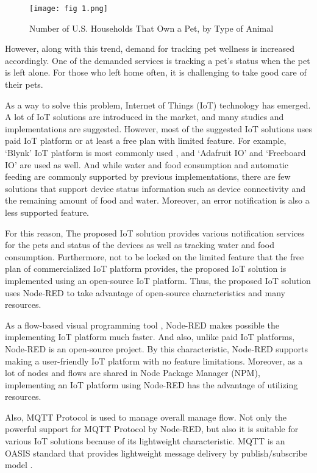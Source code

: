 \documentclass[conference]{IEEEtran}
\begin{document}
\begin{figure}[htbp]
\centerline{\texttt{[image: fig 1.png]}}
\caption{Number of U.S. Households That Own a Pet, by Type of Animal
}
\label{fig}
\end{figure}

However, along with this trend, demand for tracking pet wellness is increased accordingly. One of the demanded services is tracking a pet’s status when the pet is left alone. For those who left home often, it is challenging to take good care of their pets.

\indent As a way to solve this problem, Internet of Things (IoT) technology has emerged. A lot of IoT solutions are introduced in the market, and many studies and implementations are suggested. However, most of the suggested IoT solutions uses paid IoT platform or at least a free plan with limited feature. For example, ‘Blynk’ IoT platform is most commonly used \cite{b2} \cite{b3} \cite{b4} \cite{b5}, and ‘Adafruit IO’ \cite{b6} and ‘Freeboard IO’ \cite{b7} are used as well. And while water and food consumption and automatic feeding are commonly supported by previous implementations, there are few solutions that support device status information such as device connectivity and the remaining amount of food and water. Moreover, an error notification is also a less supported feature.

For this reason, The proposed IoT solution provides various notification services for the pets and status of the devices as well as tracking water and food consumption. Furthermore, not to be locked on the limited feature that the free plan of commercialized IoT platform provides, the proposed IoT solution is implemented using an open-source IoT platform. Thus, the proposed IoT solution uses Node-RED to take advantage of open-source characteristics and many resources.

\indent As a flow-based visual programming tool \cite{b8}, Node-RED makes possible the implementing IoT platform much faster. And also, unlike paid IoT platforms, Node-RED is an open-source project. By this characteristic, Node-RED supports making a user-friendly IoT platform with no feature limitations. Moreover, as a lot of nodes and flows are shared in Node Package Manager (NPM), implementing an IoT platform using Node-RED has the advantage of utilizing resources.

\indent Also, MQTT Protocol is used to manage overall manage flow. Not only the powerful support for MQTT Protocol by Node-RED, but also it is suitable for various IoT solutions because of its lightweight characteristic. MQTT is an OASIS standard that provides lightweight message delivery by publish/subscribe model \cite{b9}.
\end{document}
